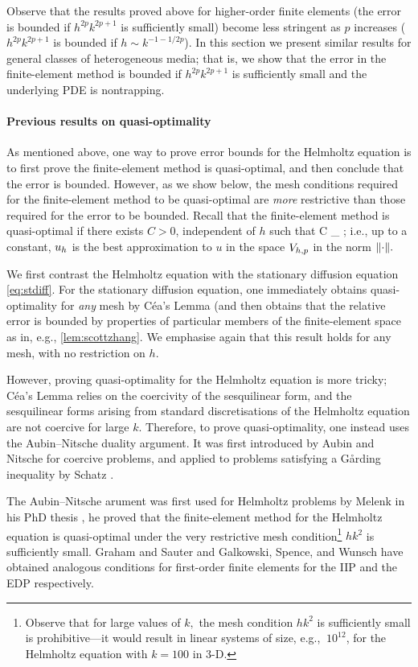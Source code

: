 Observe that the results proved above for higher-order finite elements (the error is bounded if $h^{2p}k^{2p+1}$ is sufficiently small) become less stringent as $p$ increases ($h^{2p}k^{2p+1}$ is bounded if $h \sim k^{-1-1/2p}$). In this section we present similar results for general classes of heterogeneous media; that is, we show that the error in the finite-element method is bounded if $h^{2p}k^{2p+1}$ is sufficiently small and the underlying PDE is nontrapping.

\paragraph{Previous results on quasi-optimality} As mentioned above, one way to prove error bounds for the Helmholtz equation is to first prove the finite-element method is quasi-optimal, and then conclude that the error is bounded. However, as we  show below, the mesh conditions required for the finite-element method to be quasi-optimal are \emph{more} restrictive than those required for the error to be bounded. Recall that the finite-element method is quasi-optimal if there exists $C>0$, independent of $h$ such that
\beqs
{} \leq C \inf_{\vh \in \Vhp} ;
\eeqs
i.e., up to a constant, $u_{h}$ is the best approximation to $u$ in the space $V_{h,p}$ in the norm $\N{\cdot}.$

We first contrast the Helmholtz equation with the stationary diffusion equation \eqref{eq:stdiff}. For the stationary diffusion equation, one immediately obtains quasi-optimality for \emph{any} mesh by C\'ea's Lemma (and then obtains that the relative error is bounded by properties of particular members of the finite-element space as in, e.g., \cref{lem:scottzhang}. We emphasise again that this result holds for any mesh, with no restriction on $h.$

However, proving quasi-optimality for the Helmholtz equation is more tricky; C\'ea's Lemma relies on the coercivity of the sesquilinear form, and the sesquilinear forms arising from standard discretisations of the Helmholtz equation are not coercive for large $k$. Therefore, to prove quasi-optimality, one instead uses the Aubin--Nitsche duality argument. It was first introduced by Aubin \cite{Au:67} and Nitsche \cite{Ni:68} for coercive problems, and applied to problems satisfying a G\r{a}rding inequality by Schatz \cite{Sc:74}.

The Aubin--Nitsche arument was first used for Helmholtz problems by Melenk in his PhD thesis \cite[Proposition 8.2.7]{Me:95}, he proved that the finite-element method for the Helmholtz equation is quasi-optimal under the very restrictive mesh condition\footnote{Observe that for large values of $k,$ the mesh condition $hk^2$ is sufficiently small is prohibitive---it would result in linear systems of size, e.g., $~10^{12}$, for the Helmholtz equation with $k=100$ in 3-D.} $hk^2$ is sufficiently small. Graham and Sauter \cite[Remark 4.4 b.]{GrSa:18} and Galkowski, Spence, and Wunsch \cite[Theorem 3]{GaSpWu:18} have obtained analogous conditions for first-order finite elements for the IIP \cite{GrSa:18} and the EDP \cite{GaSpWu:18} respectively.


